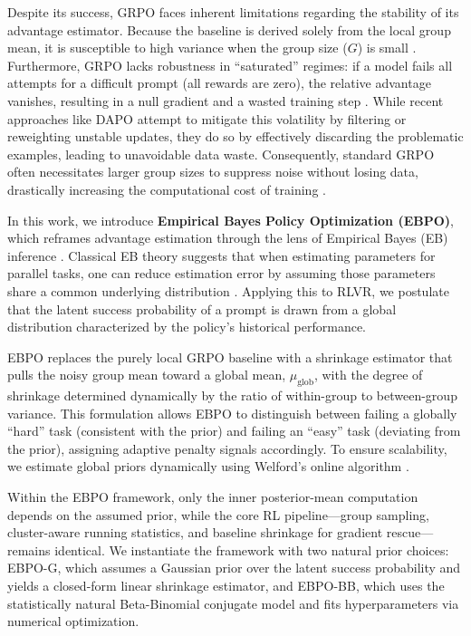 \documentclass{article}
\theoremstyle{plain}
\theoremstyle{definition}
\theoremstyle{remark}
\newcommand{\oursG}{\textsc{EBPO-G}\xspace}
\newcommand{\oursBB}{\textsc{EBPO-BB}\xspace}
\begin{document}
Despite its success, GRPO faces inherent limitations regarding the stability of its advantage estimator. Because the baseline is derived solely from the local group mean, it is susceptible to high variance when the group size ($G$) is small \citep{yu2025dapo}. Furthermore, GRPO lacks robustness in ``saturated'' regimes: if a model fails all attempts for a difficult prompt (all rewards are zero), the relative advantage vanishes, resulting in a null gradient and a wasted training step \citep{liu2025understanding}. While recent approaches like DAPO \citep{yu2025dapo} attempt to mitigate this volatility by filtering or reweighting unstable updates, they do so by effectively discarding the problematic examples, leading to unavoidable data waste. Consequently, standard GRPO often necessitates larger group sizes to suppress noise without losing data, drastically increasing the computational cost of training \citep{shao2024deepseekmath}.

In this work, we introduce \textbf{Empirical Bayes Policy Optimization (EBPO)}, which reframes advantage estimation through the lens of Empirical Bayes (EB) inference \citep{robbins1992empirical}. Classical EB theory suggests that when estimating parameters for parallel tasks, one can reduce estimation error by assuming those parameters share a common underlying distribution \citep{robbins1992empirical}. Applying this to RLVR, we postulate that the latent success probability of a prompt is drawn from a global distribution characterized by the policy's historical performance.

EBPO replaces the purely local GRPO baseline with a shrinkage estimator that pulls the noisy group mean toward a global mean, $\mu_{\text{glob}}$, with the degree of shrinkage determined dynamically by the ratio of within-group to between-group variance. This formulation allows EBPO to distinguish between failing a globally ``hard'' task (consistent with the prior) and failing an ``easy'' task (deviating from the prior), assigning adaptive penalty signals accordingly. To ensure scalability, we estimate global priors dynamically using Welford's online algorithm \citep{welford1962note}.

Within the EBPO framework, only the inner posterior-mean computation depends on the assumed prior, while the core RL pipeline---group sampling, cluster-aware running statistics, and baseline shrinkage for gradient rescue---remains identical. We instantiate the framework with two natural prior choices: \oursG, which assumes a Gaussian prior over the latent success probability and yields a closed-form linear shrinkage estimator, and \oursBB, which uses the statistically natural Beta-Binomial conjugate model and fits hyperparameters via numerical optimization.
\end{document}
